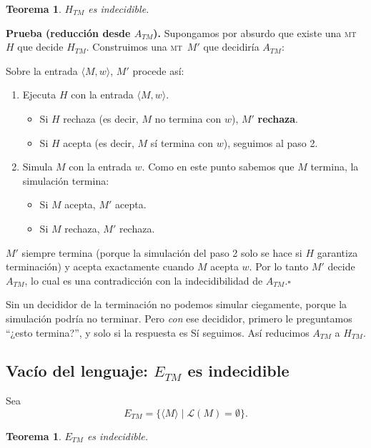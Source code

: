 \documentclass[11pt,a4paper]{article}
\theoremstyle{definicion}
\newtheorem{teorema}[definicion]{Teorema}
\newcommand{\MT}{\textsc{mt}}
\newcommand{\enc}[1]{\langle #1 \rangle}
\newcommand{\Lang}{\mathcal{L}}
\begin{document}
\begin{teorema}
$H_{TM}$ es indecidible.
\end{teorema}

\textbf{Prueba (reducción desde $A_{TM}$).} Supongamos por absurdo que existe una \MT\ $H$ que decide $H_{TM}$. Construimos una \MT\ $M'$ que decidiría $A_{TM}$:

Sobre la entrada $\enc{M, w}$, $M'$ procede así:
\begin{enumerate}
    \item Ejecuta $H$ con la entrada $\enc{M, w}$.
    \begin{itemize}
        \item Si $H$ rechaza (es decir, $M$ no termina con $w$), $M'$ \textbf{rechaza}.
        \item Si $H$ acepta (es decir, $M$ sí termina con $w$), seguimos al paso 2.
    \end{itemize}
    \item Simula $M$ con la entrada $w$. Como en este punto sabemos que $M$ termina, la simulación termina:
    \begin{itemize}
        \item Si $M$ acepta, $M'$ acepta.
        \item Si $M$ rechaza, $M'$ rechaza.
    \end{itemize}
\end{enumerate}

$M'$ siempre termina (porque la simulación del paso 2 solo se hace si $H$ garantiza terminación) y acepta exactamente cuando $M$ acepta $w$. Por lo tanto $M'$ decide $A_{TM}$, lo cual es una contradicción con la indecidibilidad de $A_{TM}$.\hfill$\square$

\begin{intuicion}
Sin un decididor de la terminación no podemos simular ciegamente, porque la simulación podría no terminar. Pero \emph{con} ese decididor, primero le preguntamos ``¿esto termina?'', y solo si la respuesta es Sí seguimos. Así reducimos $A_{TM}$ a $H_{TM}$.
\end{intuicion}

\subsection{Vacío del lenguaje: $E_{TM}$ es indecidible}

Sea
\[
E_{TM} = \{ \enc{M} \mid \Lang(M) = \emptyset \}.
\]

\begin{teorema}
$E_{TM}$ es indecidible.
\end{teorema}
\end{document}
